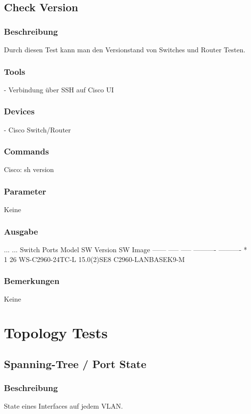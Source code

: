 \documentclass[a4,12pt]{scrartcl}
\begin{document}
\subsection{Check Version}
\subsubsection{Beschreibung}
Durch diesen Test kann man den Versionstand von Switches und Router Testen.
\subsubsection{Tools}
- Verbindung über SSH auf Cisco UI
\subsubsection{Devices}
- Cisco Switch/Router
\subsubsection{Commands}
Cisco: sh version
\subsubsection{Parameter}
Keine
\subsubsection{Ausgabe}
...\newline
...\newline
Switch Ports Model              SW Version            SW Image\newline
------ ----- -----              ----------            ----------\newline
*    1 26    WS-C2960-24TC-L    15.0(2)SE8            C2960-LANBASEK9-M\newline
\subsubsection{Bemerkungen}
Keine

\newpage
\section{Topology Tests}

\subsection{Spanning-Tree / Port State}
\subsubsection{Beschreibung}
State eines Interfaces auf jedem VLAN.
\end{document}
